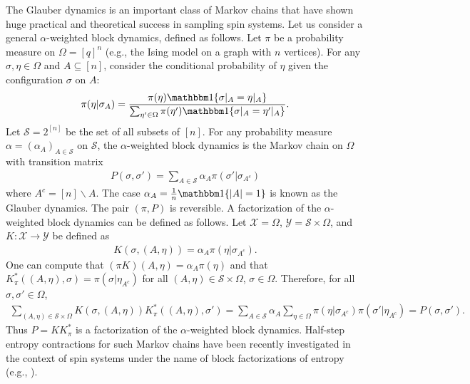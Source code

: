 \documentclass[11pt]{article}
\def\cS{\mathcal{S}}
\def\cX{\mathcal{X}}
\def\cY{\mathcal{Y}}
\theoremstyle{definition}
\begin{document}
The Glauber dynamics is an important class of Markov chains that have shown huge practical and theoretical success in sampling spin systems.
Let us consider a general $\alpha$-weighted block dynamics, defined as follows.
Let $\pi$ be a probability measure on $\Omega=[q]^n$ (e.g., the Ising model on a graph with $n$ vertices). For any $\sigma,\eta\in \Omega$ and $A\subseteq [n]$, consider the conditional probability of $\eta$ given the configuration $\sigma$ on $A$:
\begin{align}
  \pi(\eta | \sigma_A) = \frac{\pi(\eta) \mathbbm1\{\sigma|_A = \eta|_A\}}{\sum_{\eta'\in \Omega} \pi(\eta') \mathbbm1\{\sigma|_A = \eta'|_A\}}.
\end{align}
Let $\cS = 2^{[n]}$ be the set of all subsets of $[n]$. For any probability measure $\alpha = (\alpha_A)_{A\in \cS}$ on $\cS$, the $\alpha$-weighted block dynamics is the Markov chain on $\Omega$ with transition matrix
\begin{align}
  P(\sigma,\sigma') = \sum_{A\in \cS} \alpha_A \pi(\sigma' | \sigma_{A^c})
\end{align}
where $A^c = [n]\backslash A$. The case $\alpha_A = \frac 1n \mathbbm1\{|A|=1\}$ is known as the Glauber dynamics. The pair $(\pi, P)$ is reversible. A factorization of the $\alpha$-weighted block dynamics can be defined as follows.
Let $\cX = \Omega$, $\cY=\cS \times \Omega$, and $K: \cX \to \cY$ be defined as
\begin{align}
  K(\sigma, (A, \eta)) = \alpha_A \pi(\eta | \sigma_{A^c}).
\end{align}
One can compute that $(\pi K)(A, \eta) = \alpha_A \pi(\eta)$ and that $K_\pi^*((A,\eta), \sigma) = \pi(\sigma | \eta_{A^c})$ for all $(A,\eta)\in \cS \times \Omega$, $\sigma\in \Omega$.
Therefore, for all $\sigma,\sigma'\in \Omega$,
\begin{align}
  \sum_{(A,\eta)\in \cS \times \Omega} K(\sigma, (A,\eta)) K_\pi^*((A,\eta), \sigma')
  = \sum_{A\in \cS} \alpha_A \sum_{\eta\in \Omega} \pi(\eta | \sigma_{A^c}) \pi(\sigma'|\eta_{A^c})
  = P(\sigma,\sigma').
\end{align}
Thus $P=KK_\pi^*$ is a factorization of the $\alpha$-weighted block dynamics.
Half-step entropy contractions for such Markov chains have been recently investigated in the context of spin systems under the name of block factorizations of entropy (e.g., \cite{BCCPSV22}).
\end{document}
